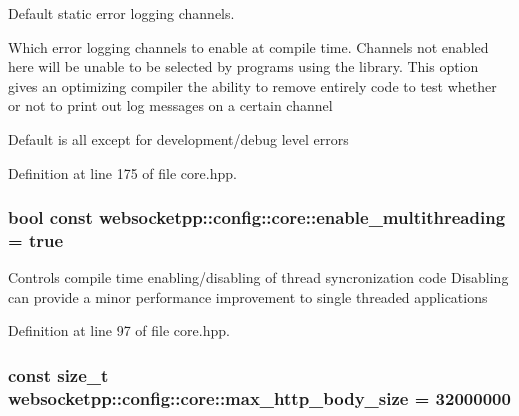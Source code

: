 Default static error logging channels. 

Which error logging channels to enable at compile time. Channels not enabled here will be unable to be selected by programs using the library. This option gives an optimizing compiler the ability to remove entirely code to test whether or not to print out log messages on a certain channel

Default is all except for development/debug level errors 

Definition at line 175 of file core.\+hpp.

\subsubsection[{\texorpdfstring{enable\+\_\+multithreading}{enable\_multithreading}}]{\setlength{\rightskip}{0pt plus 5cm}bool const websocketpp\+::config\+::core\+::enable\+\_\+multithreading = true\hspace{0.3cm}{\ttfamily [static]}}\hypertarget{structwebsocketpp_1_1config_1_1core_ad3ed5fc89c7a79e7c2c5193f640d87ba}{}\label{structwebsocketpp_1_1config_1_1core_ad3ed5fc89c7a79e7c2c5193f640d87ba}
Controls compile time enabling/disabling of thread syncronization code Disabling can provide a minor performance improvement to single threaded applications 

Definition at line 97 of file core.\+hpp.

\subsubsection[{\texorpdfstring{max\+\_\+http\+\_\+body\+\_\+size}{max\_http\_body\_size}}]{\setlength{\rightskip}{0pt plus 5cm}const size\+\_\+t websocketpp\+::config\+::core\+::max\+\_\+http\+\_\+body\+\_\+size = 32000000\hspace{0.3cm}{\ttfamily [static]}}\hypertarget{structwebsocketpp_1_1config_1_1core_a4836b30dbc83db465f44aabae4e8ef55}{}\label{structwebsocketpp_1_1config_1_1core_a4836b30dbc83db465f44aabae4e8ef55}


